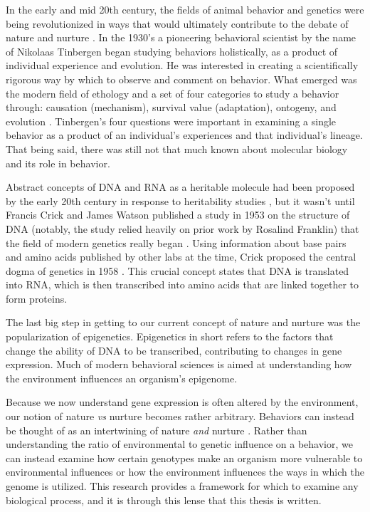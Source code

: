 \documentclass[12pt,twoside]{reedthesis}
\begin{document}
In the early and mid 20th century, the fields of animal behavior and
genetics were being revolutionized in ways that would ultimately contribute to the debate of
nature and nurture \citep{krubitzer_nature_2003}. In the 1930's a pioneering behavioral scientist by the name of Nikolaas Tinbergen began
studying behaviors holistically, as a product of individual
experience and evolution. He was interested in creating a scientifically
rigorous way by which to observe and comment on behavior.
What emerged was the modern field of ethology and a set of four categories to
study a behavior through: causation (mechanism), survival value (adaptation),
ontogeny, and evolution \citep{tinbergen_aims_2005}.
Tinbergen's four questions were important in examining a single behavior as a product of an
individual's experiences and that individual's lineage. That being said, there
was still not that much known about molecular biology and its role in behavior.

Abstract concepts of DNA and RNA as a heritable molecule had been proposed by the early 20th century in response to heritability
studies \citep{koltzoff_structure_1934, hershey_independent_1952}, but it wasn't until
Francis Crick and James Watson published a study in 1953 on the structure of DNA
(notably, the 
study relied heavily on prior work by Rosalind Franklin) that
the field of modern genetics really began \citep{watson_molecular_1953}. Using
information about base pairs and amino acids published by other labs at the
time, Crick proposed the
central dogma of genetics in 1958 \citep{crick_protein_1958}. This crucial concept states that DNA is translated into RNA, which is then
transcribed into amino acids that are linked together to form proteins.

The last big step in getting to our current concept of nature and nurture was
the popularization of epigenetics. Epigenetics in short refers to
the factors that change the ability of DNA to be transcribed, contributing to
changes in gene expression. Much of modern behavioral sciences is aimed at understanding
how the environment influences an organism's epigenome. 

Because we now understand gene expression is often altered by the environment, our notion of
nature \textit{vs} nurture becomes rather arbitrary. Behaviors can instead be
thought of as an intertwining of nature \textit{and} nurture
\citep{sasaki_nature_2017, meaney_nature_2006}. Rather than
understanding the ratio of environmental to genetic influence on a behavior, we
can instead examine how certain genotypes make an organism more vulnerable to
environmental influences or how the environment influences the ways in which the
genome is utilized. This research provides a framework for
which to examine any biological process, and it is through this lense that this
thesis is written.   
\end{document}
